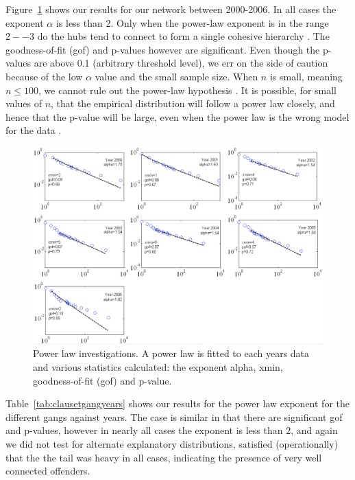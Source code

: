 \documentclass[conference]{IEEEtran}
\theoremstyle{definition}
\begin{document}
Figure~\ref{fig:clausetcumulative} shows our results for our network
between 2000-2006. In all cases the exponent $\alpha$ is less than
2. Only when the power-law exponent is in the range $2--3$ do the
hubs tend to connect to form a single cohesive hierarchy
\cite{AdamicLukoseHuberman2003}.  The goodness-of-fit (gof) and
p-values however are significant. Even though the p-values are above
0.1 (arbitrary threshold level), we err on the side of caution because
of the low $\alpha$ value and the small sample size. When $n$ is
small, meaning $n \leq 100$, we cannot rule out the power-law
hypothesis \cite{ClausetShaliziNewman2009}. It is possible, for small
values of $n$, that the empirical distribution will follow a power law
closely, and hence that the p-value will be large, even when the power
law is the wrong model for the data
\cite{ClausetShaliziNewman2009}. 

\begin{figure}[!ht]
\centering
\includegraphics[width=\columnwidth]{images/clausetcumulative}
\caption{Power law investigations. A power law is fitted to each years data and various statistics calculated: the exponent alpha, xmin, goodness-of-fit (gof) and p-value.}
\label{fig:clausetcumulative}
\end{figure}

Table~\ref{tab:clausetgangyears} shows our results for the power law
exponent for the different gangs against years. The case is similar in
that there are significant gof and p-values, however in nearly all
cases the exponent is less than 2, and again we did not test for
alternate explanatory distributions, satisfied (operationally) that
the the tail was heavy in all cases, indicating the presence of very
well connected offenders.
\end{document}
